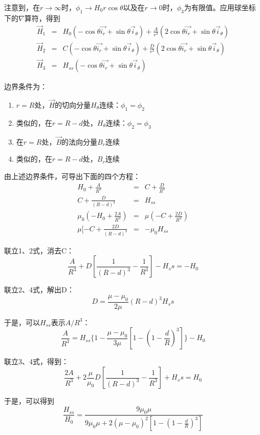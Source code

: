 注意到，在$r\rightarrow \infty$时，$\phi_1 \rightarrow H_0 r\cos\theta$以及在$r\rightarrow 0$时，$\phi_3$为有限值。应用球坐标下的$\nabla$算符，得到
\begin{eqnarray*}
  \vec{H}_1 &=& H_0 (-\cos\theta\vec{i_r}+\sin\theta\vec{i}_\theta)+\frac{A}{r^3} (2\cos\theta\vec{i_r}+\sin\theta\vec{i}_\theta)\\
  \vec{H}_2 &=& C(-\cos\theta\vec{i_r}+\sin\theta\vec{i}_\theta)+\frac{D}{r^3} (2\cos\theta\vec{i_r}+\sin\theta\vec{i}_\theta)\\
   \vec{H}_3 &=& H_{ss}  (-\cos\theta\vec{i_r}+\sin\theta\vec{i}_\theta)
\end{eqnarray*}

边界条件为：
\begin{enumerate}
  \item $r=R$处，$\vec{H}$的切向分量$H_\theta$连续：$\phi_1=\phi_2   $
  \item 类似的，在$r=R-d$处，$H_\theta$连续：$\phi_2=\phi_3  $
  \item 在$r=R$处，$\vec{B}$的法向分量$B_r$连续
  \item 类似的，在$r=R-d$处，$B_r$连续
\end{enumerate}

由上述边界条件，可导出下面的四个方程：
\begin{eqnarray*}
  H_0+\frac{A}{R^3}&=& C+\frac{D}{R^3} \\
  C+\frac{D}{(R-d)^3}&=& H_{ss}\\
  \mu_0(-H_0+\frac{2A}{R^3})&=& \mu(-C+\frac{2D}{R^3})\\
  \mu[-C+\frac{2D}{(R-d)^3}&=& -\mu_0 H_{ss}
\end{eqnarray*}

联立1、2式，消去C：
$$
\frac{A}{R^3}+D[\frac{1}{(R-d)^3}-\frac{1}{R^3}]-H_ss =-H_0
$$

联立2、4式，解出D：
$$
D=\frac{\mu-\mu_0}{2\mu} (R-d)^3 H_ss
$$

于是，可以$H_{ss}$表示$A/R^3$：
$$
\frac{A}{R^3}=H_{ss}\{1-\frac{\mu-\mu_0}{3\mu}[1-(1-\frac{d}{R})^3]\}-H_0
$$

联立3、4式，得到：
$$
\frac{2A}{R^3}+2\frac{\mu}{\mu_0}D[\frac{1}{(R-d)^3}-\frac{1}{R^3}]+H_ss =H_0
$$

于是，可以得到
\begin{equation*}
\frac{H_{ss}}{H_0}=\frac{9\mu_0 \mu}{9\mu_0 \mu+2(\mu-\mu_0)^2\left[1-\left(1-\frac{d}{R}\right)^3\right]}
\end{equation*}

